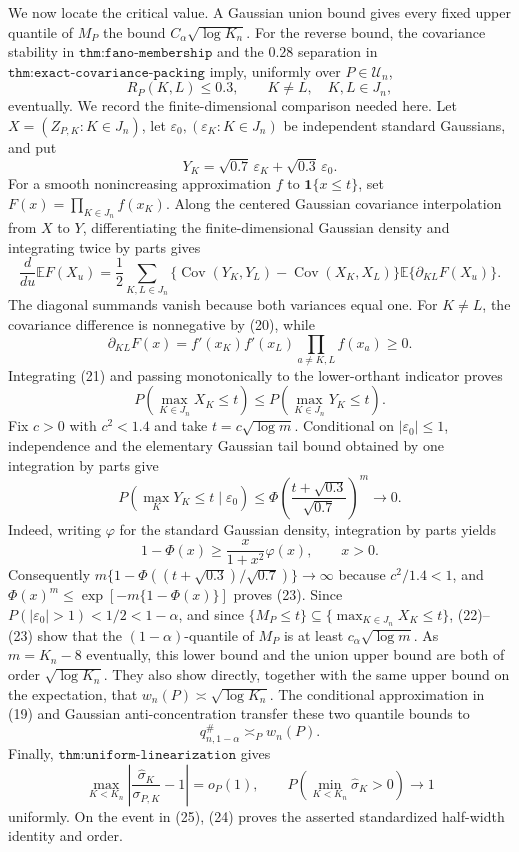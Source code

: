 We now locate the critical value.  A Gaussian union bound gives every fixed upper quantile of \(M_P\) the bound \(C_\alpha\sqrt{\log K_n}\).  For the reverse bound, the covariance stability in \(\texttt{thm:fano-membership}\) and the \(0.28\) separation in \(\texttt{thm:exact-covariance-packing}\) imply, uniformly over \(P\in\mathcal U_n\),
\[
 R_P(K,L)\leq0.3,\qquad K\ne L,\quad K,L\in J_n,
 \tag{20}
\]
eventually.  We record the finite-dimensional comparison needed here.  Let \(X=(Z_{P,K}:K\in J_n)\), let \(\varepsilon_0,(\varepsilon_K:K\in J_n)\) be independent standard Gaussians, and put
\[
 Y_K=\sqrt{0.7}\,\varepsilon_K+\sqrt{0.3}\,\varepsilon_0.
\]
For a smooth nonincreasing approximation \(f\) to \(\mathbf1\{x\leq t\}\), set \(F(x)=\prod_{K\in J_n}f(x_K)\).  Along the centered Gaussian covariance interpolation from \(X\) to \(Y\), differentiating the finite-dimensional Gaussian density and integrating twice by parts gives
\[
 \frac{d}{du}\mathbb EF(X_u)
 =\frac12\sum_{K,L\in J_n}
 \{\operatorname{Cov}(Y_K,Y_L)-\operatorname{Cov}(X_K,X_L)\}
 \mathbb E\{\partial_{KL}F(X_u)\}.
 \tag{21}
\]
The diagonal summands vanish because both variances equal one.  For \(K\ne L\), the covariance difference is nonnegative by (20), while
\[
 \partial_{KL}F(x)=f'(x_K)f'(x_L)
 \prod_{a\ne K,L}f(x_a)\geq0.
\]
Integrating (21) and passing monotonically to the lower-orthant indicator proves
\[
 P\!\left(\max_{K\in J_n}X_K\leq t\right)
 \leq
 P\!\left(\max_{K\in J_n}Y_K\leq t\right).
 \tag{22}
\]
Fix \(c>0\) with \(c^2<1.4\) and take \(t=c\sqrt{\log m}\).  Conditional on \(|\varepsilon_0|\leq1\), independence and the elementary Gaussian tail bound obtained by one integration by parts give
\[
P\!\left(\max_KY_K\leq t\mid\varepsilon_0\right)
\leq
\Phi\!\left(\frac{t+\sqrt{0.3}}{\sqrt{0.7}}\right)^m
\longrightarrow0.
\tag{23}
\]
Indeed, writing \(\varphi\) for the standard Gaussian density, integration by parts yields
\[
 1-\Phi(x)\geq\frac{x}{1+x^2}\varphi(x),\qquad x>0.
\]
Consequently \(m\{1-\Phi((t+\sqrt{0.3})/\sqrt{0.7})\}\to\infty\) because \(c^2/1.4<1\), and \(\Phi(x)^m\leq\exp[-m\{1-\Phi(x)\}]\) proves (23).  Since \(P(|\varepsilon_0|>1)<1/2<1-\alpha\), and since \(\{M_P\leq t\}\subseteq\{\max_{K\in J_n}X_K\leq t\}\), (22)--(23) show that the \((1-\alpha)\)-quantile of \(M_P\) is at least \(c_\alpha\sqrt{\log m}\).  As \(m=K_n-8\) eventually, this lower bound and the union upper bound are both of order \(\sqrt{\log K_n}\).  They also show directly, together with the same upper bound on the expectation, that \(w_n(P)\asymp\sqrt{\log K_n}\).  The conditional approximation in (19) and Gaussian anti-concentration transfer these two quantile bounds to
\[
 q_{n,1-\alpha}^{\#}\asymp_P w_n(P).
 \tag{24}
\]
Finally, \(\texttt{thm:uniform-linearization}\) gives
\[
 \max_{K<K_n}\left|\frac{\widehat\sigma_K}{\sigma_{P,K}}-1\right|=o_P(1),
 \qquad
 P\!\left(\min_{K<K_n}\widehat\sigma_K>0\right)\longrightarrow1
 \tag{25}
\]
uniformly.  On the event in (25), (24) proves the asserted standardized half-width identity and order.

